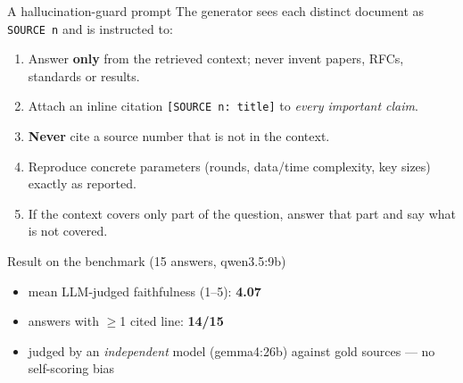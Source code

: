 \documentclass[aspectratio=169]{beamer}
\begin{document}
\begin{frame}{A hallucination-guard prompt}
  The generator sees each distinct document as \texttt{SOURCE n} and is
  instructed to:
  \vspace{2mm}
  \begin{enumerate}
    \item Answer \textbf{only} from the retrieved context; never invent
      papers, RFCs, standards or results.
    \item Attach an inline citation \texttt{[SOURCE n: title]} to \emph{every
      important claim}.
    \item \textbf{Never} cite a source number that is not in the context.
    \item Reproduce concrete parameters (rounds, data/time complexity, key
      sizes) exactly as reported.
    \item If the context covers only part of the question, answer that part
      and say what is not covered.
  \end{enumerate}
  \pause
  \begin{block}{Result on the benchmark (15 answers, qwen3.5:9b)}
    \begin{itemize}
      \item mean LLM-judged faithfulness (1--5): \textbf{4.07}
      \item answers with $\geq$1 cited line: \textbf{14/15}
      \item judged by an \emph{independent} model (gemma4:26b) against gold
        sources --- no self-scoring bias
    \end{itemize}
  \end{block}
\end{frame}
\end{document}
